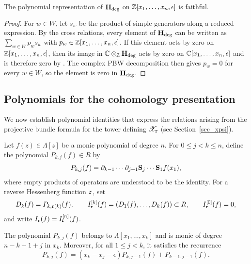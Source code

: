 \begin{lemma}\label{lem:polynomial_faithful}
The polynomial representation of $\mathbf H_{\mathrm{deg}}$ on
$\mathbb Z[x_1,\dots,x_n,\epsilon]$ is faithful.
\end{lemma}

\begin{proof}
For $w\in W$, let $s_w$ be the product of simple generators along a reduced expression.
By the cross relations, every element of $\mathbf H_{\mathrm{deg}}$ can be written as
$\sum_{w\in W}p_w s_w$ with $p_w\in\mathbb Z[x_1,\dots,x_n,\epsilon]$.
If this element acts by zero on $\mathbb Z[x_1,\dots,x_n,\epsilon]$, then its image in
$\mathbb C\otimes_{\mathbb Z}\mathbf H_{\mathrm{deg}}$ acts by zero on $\mathbb C[x_1,\dots,x_n,\epsilon]$ and is therefore zero
by \cite[Proposition~12.2(ii)]{ginzburg1998geometric}.
The complex PBW decomposition \cite[Definition~12.1(i)]{ginzburg1998geometric}
then gives $p_w=0$ for every $w\in W$, so the element is zero in $\mathbf H_{\mathrm{deg}}$.
\end{proof}

\subsection{Polynomials for the cohomology presentation}\label{ss:lemmas_polynomials}

We now establish polynomial identities that express the relations arising from the
projective bundle formula for the tower defining $\mathscr X_{\mathtt r}$ (see Section~\ref{sec_xpsi}).

Let $f(z)\in\Lambda[z]$ be a monic polynomial of degree $n$.
For $0\leq j<k\leq n$, define the polynomial $P_{k,j}(f)\in R$ by
\[
  P_{k,j}(f)
  =\partial_{k-1}\cdots\partial_{j+1}
       \mathbf S_j\cdots\mathbf S_1 f(x_1),
\]
where empty products of operators are understood to be the identity.
For a reverse Hessenberg function $\mathtt r$, set
\[
  D_k(f)=P_{k,\mathtt r(k)}(f),\qquad
  I_{\mathtt r}^{[k]}(f)=(D_1(f),\dots,D_k(f))\subset R,
  \qquad I_{\mathtt r}^{[0]}(f)=0,
\]
and write $I_{\mathtt r}(f)=I_{\mathtt r}^{[n]}(f)$.

\begin{lemma}\label{lem:polynomial_recurrence}
The polynomial $P_{k,j}(f)$ belongs to $\Lambda[x_1,\dots,x_k]$ and is monic
of degree $n-k+1+j$ in $x_k$.
Moreover, for all $1\leq j<k$, it satisfies the recurrence
\begin{equation}\label{eq:triangular_polynomial_recurrence}
  P_{k,j}(f)
  =(x_k-x_j-\epsilon)P_{k,j-1}(f)+P_{k-1,j-1}(f).
\end{equation}
\end{lemma}

